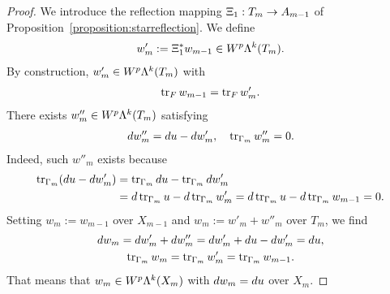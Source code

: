 \documentclass[10pt,a4paper]{article}
\begin{document}
\begin{proof}
    We introduce the reflection mapping $\Xi_{1} : T_{m} \rightarrow A_{m-1}$ of Proposition~\ref{proposition:starreflection}. 
    We define 
    \begin{align*}
        w'_{m} :=  \Xi_{1}^{\ast} w_{m-1} \in W^{p}\Lambda^{k}(T_{m}).
    \end{align*}
    By construction, $w'_{m} \in W^{p}\Lambda^{k}(T_{m})$ with 
    \begin{align*}
        \operatorname{tr}_F w_{m-1} = \operatorname{tr}_F w'_{m}
        . 
    \end{align*}
    There exists $w''_{m} \in W^{p}\Lambda^{k}(T_{m})$ satisfying 
    \begin{align*}
        d w''_{m} = d u - d w'_{m}, 
        \quad 
        \operatorname{tr}_{\Gamma_{m}} w''_{m} = 0.
    \end{align*}
    Indeed, such $w''_{m}$ exists because 
    \begin{align*}
        \operatorname{tr}_{\Gamma_{m}}( d u - d w'_{m} ) 
        &= 
        \operatorname{tr}_{\Gamma_{m}} d u - \operatorname{tr}_{\Gamma_{m}} d w'_{m}
        \\&= 
        d \operatorname{tr}_{\Gamma_{m}} u - d \operatorname{tr}_{\Gamma_{m}} w'_{m}
        = 
        d \operatorname{tr}_{\Gamma_{m}} u - d \operatorname{tr}_{\Gamma_{m}} w_{m-1}
        = 
        0
        .
    \end{align*}
    Setting $w_{m} := w_{m-1}$ over $X_{m-1}$ and $w_{m} := w'_{m} + w''_{m}$ over $T_{m}$, 
    we find 
    \begin{gather*}
        d w_{m} = d w'_{m} + d w''_{m} = d w'_{m} + d u - d w'_{m} = d u,
        \\
        \operatorname{tr}_{\Gamma_{m}} w_{m} = \operatorname{tr}_{\Gamma_{m}} w'_{m} = \operatorname{tr}_{\Gamma_{m}} w_{m-1}.
    \end{gather*}
    That means that $w_{m} \in W^{p}\Lambda^{k}(X_{m})$ with $d w_{m} = d u$ over $X_{m}$. 
    

\end{proof}
\end{document}
